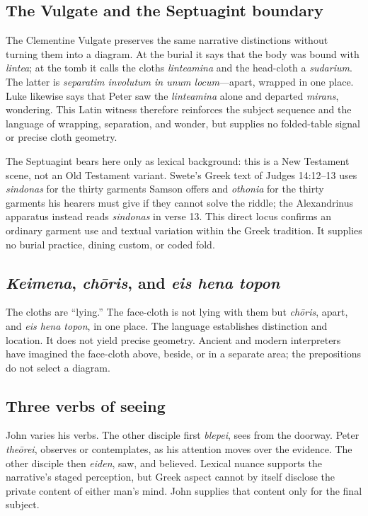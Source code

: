 \subsection{The Vulgate and the Septuagint boundary}

The Clementine Vulgate preserves the same narrative distinctions without
turning them into a diagram. At the burial it says that the body was bound
with \emph{lintea}; at the tomb it calls the cloths \emph{linteamina} and the
head-cloth a \emph{sudarium}. The latter is \emph{separatim involutum in unum
locum}---apart, wrapped in one place. Luke likewise says that Peter saw the
\emph{linteamina} alone and departed \emph{mirans}, wondering. This Latin
witness therefore reinforces the subject sequence and the language of
wrapping, separation, and wonder, but supplies no folded-table signal or
precise cloth geometry.

The Septuagint bears here only as lexical background: this is a New Testament
scene, not an Old Testament variant. Swete's Greek text of Judges 14:12--13
uses \emph{sindonas} for the thirty garments Samson offers and
\emph{othonia} for the thirty garments his hearers must give if they cannot
solve the riddle; the Alexandrinus apparatus instead reads \emph{sindonas} in
verse 13. This direct locus confirms an ordinary garment use and textual
variation within the Greek tradition. It supplies no burial practice, dining
custom, or coded fold.

\subsection{\emph{Keimena}, \emph{ch\=oris}, and \emph{eis hena topon}}

The cloths are ``lying.'' The face-cloth is not lying with them but
\emph{ch\=oris}, apart, and \emph{eis hena topon}, in one place. The language
establishes distinction and location. It does not yield precise geometry.
Ancient and modern interpreters have imagined the face-cloth above, beside, or
in a separate area; the prepositions do not select a diagram.

\subsection{Three verbs of seeing}

John varies his verbs. The other disciple first \emph{blepei}, sees from the
doorway. Peter \emph{the\=orei}, observes or contemplates, as his attention
moves over the evidence. The other disciple then \emph{eiden}, saw, and
believed. Lexical nuance supports the narrative's staged perception, but Greek
aspect cannot by itself disclose the private content of either man's mind.
John supplies that content only for the final subject.

